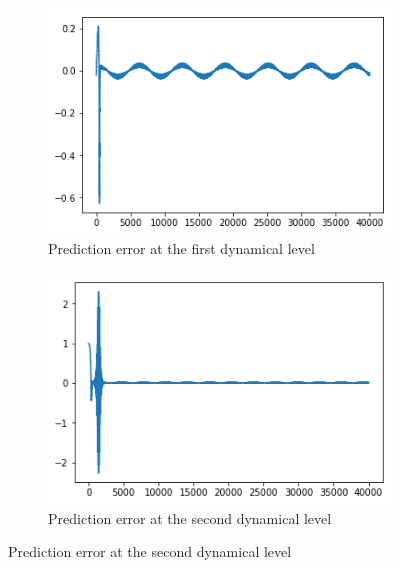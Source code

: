 \begin{figure}[H]
\begin{subfigure}{.3\linewidth}
    \centering
    \includegraphics[scale=0.5]{chapter_3_figures/dynamics_sine_wave_ez1.png}
    \caption{Prediction error at the first dynamical level}
\end{subfigure}
\hfill
\begin{subfigure}{.3\linewidth}
    \centering
    \includegraphics[scale=0.5]{chapter_3_figures/dynamics_sine_wave_ez2.png}
    \caption{Prediction error at the second dynamical level}
\end{subfigure}
    

\end{figure}
